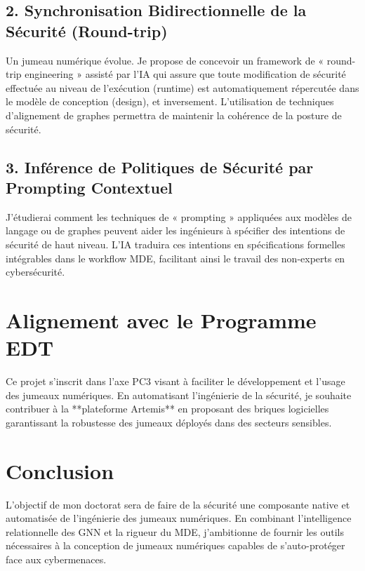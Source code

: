 \documentclass[11pt,a4paper]{article}
\begin{document}
\subsection{2. Synchronisation Bidirectionnelle de la Sécurité (Round-trip)}
Un jumeau numérique évolue. Je propose de concevoir un framework de « round-trip engineering » assisté par l'IA qui assure que toute modification de sécurité effectuée au niveau de l'exécution (runtime) est automatiquement répercutée dans le modèle de conception (design), et inversement. L'utilisation de techniques d'alignement de graphes permettra de maintenir la cohérence de la posture de sécurité.

\subsection{3. Inférence de Politiques de Sécurité par Prompting Contextuel}
J'étudierai comment les techniques de « prompting » appliquées aux modèles de langage ou de graphes peuvent aider les ingénieurs à spécifier des intentions de sécurité de haut niveau. L'IA traduira ces intentions en spécifications formelles intégrables dans le workflow MDE, facilitant ainsi le travail des non-experts en cybersécurité.

\section{Alignement avec le Programme EDT}
Ce projet s'inscrit dans l'axe PC3 visant à faciliter le développement et l'usage des jumeaux numériques. En automatisant l'ingénierie de la sécurité, je souhaite contribuer à la **plateforme Artemis** en proposant des briques logicielles garantissant la robustesse des jumeaux déployés dans des secteurs sensibles.

\section{Conclusion}
L'objectif de mon doctorat sera de faire de la sécurité une composante native et automatisée de l'ingénierie des jumeaux numériques. En combinant l'intelligence relationnelle des GNN et la rigueur du MDE, j'ambitionne de fournir les outils nécessaires à la conception de jumeaux numériques capables de s'auto-protéger face aux cybermenaces.
\end{document}
